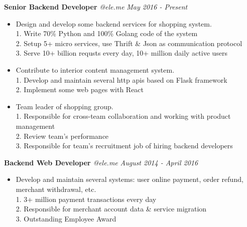 ﻿\documentclass[9pt]{article}
\newenvironment{changemargin}[2]{%
  \begin{list}{}{%
    \setlength{\topsep}{0pt}%
    \setlength{\leftmargin}{#1}%
    \setlength{\rightmargin}{#2}%
    \setlength{\listparindent}{\parindent}%
    \setlength{\itemindent}{\parindent}%
    \setlength{\parsep}{\parskip}%
  }%
  \item[]}{\end{list}
}
\newenvironment{body} {
	\vspace*{-16pt}
	\begin{changemargin}{-0.25in}{-0.5in}
  }
	{\end{changemargin}
}
\begin{document}
\begin{body}
	\vspace{14pt}

    \textbf{Senior Backend Developer} \emph{@ele.me} \hfill \emph{May 2016 - Present}\\
    \vspace*{-4pt}
    \begin{itemize} \itemsep -0pt  %
        \item Design and develop some backend services for shopping system.\\
        1. Write 70\% Python and 100\% Golang code of the system\\
        2. Setup 5+ micro services, use Thrift \& Json as communication protocol\\
        3. Serve 10+ billion requsts every day, 10+ million daily active users\\
        \item Contribute to interior content management system.\\
        1. Develop and maintain several http apis based on Flask framework\\
        2. Implement some web pages with React\\
        \item Team leader of shopping group.\\
        1. Responsible for cross-team collaboration and working with product management\\
        2. Review team's performance\\
        3. Responsible for team's recruitment job of hiring backend developers\\
    \end{itemize}

    \textbf{Backend Web Developer} \emph{@ele.me} \hfill \emph{August 2014 - April 2016}\\
    \vspace*{-4pt}
    \begin{itemize} \itemsep -0pt  %
        \item Develop and maintain several systems: user online payment, order refund, merchant withdrawal, etc.\\
        1. 3+ million payment transactions every day\\
        2. Responsible for merchant account data \& service migration\\
        3. Outstanding Employee Award\\
    \end{itemize}


\end{body}
\end{document}
